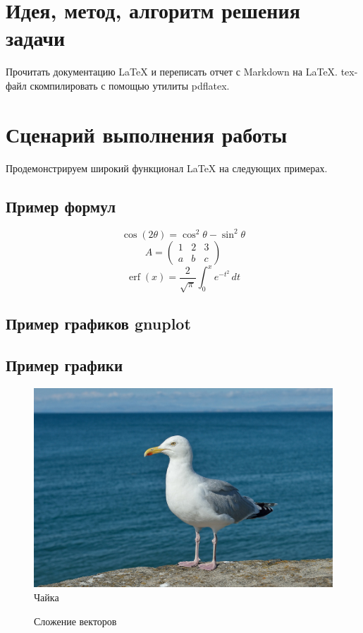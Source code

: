 \documentclass[12pt, letterpaper]{article}
\DeclareMathOperator\erf{erf}
\DeclareMathOperator\erf{erf}
\begin{document}
\section{Идея, метод, алгоритм решения задачи}
Прочитать документацию \LaTeX{} и переписать отчет с Markdown на \LaTeX{}. tex-файл скомпилировать с помощью утилиты pdflatex.
\section{Сценарий выполнения работы}
Продемонстрируем широкий функционал \LaTeX{} на следующих примерах.
\subsection{Пример формул}
\[\cos (2\theta) = \cos^2 \theta - \sin^2 \theta\]
\[A=
\begin{pmatrix}
1 & 2 & 3\\
a & b & c
\end{pmatrix}\]
\[
\erf(x)=\frac{2}{\sqrt{\pi}}\int_{0}^{x}e^{-t^{2}}\, dt
\]
\subsection{Пример графиков gnuplot}

\subsection{Пример графики}
\begin{figure}[H]
\includegraphics{gull}
\centering
\caption{Чайка}
\end{figure}
\begin{figure}[H]
\centering
\caption{Сложение векторов}
\end{figure}
\end{document}
